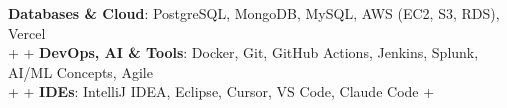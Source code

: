 \documentclass[letterpaper,10pt]{article}                                                                                                                                                                                                                                                                                                                                                                                                                                                                                                                                                                         +
\begin{document}
\begin{itemize}[leftmargin=0.15in, label={}, itemsep=2pt]
{{  \textbf{Databases \& Cloud}{: PostgreSQL, MongoDB, MySQL, AWS (EC2, S3, RDS), Vercel} \\                                                                                                                                                                                                                                                                                                                                                                                                                                                                                                                         +
                                                                                                                                                                                                                                                                                                                                                                                                                                                                                                                                                                                                                   +
  \textbf{DevOps, AI \& Tools}{: Docker, Git, GitHub Actions, Jenkins, Splunk, AI/ML Concepts, Agile} \\                                                                                                                                                                                                                                                                                                                                                                                                                                                                                                           +
                                                                                                                                                                                                                                                                                                                                                                                                                                                                                                                                                                                                                   +
  \textbf{IDEs}{: IntelliJ IDEA, Eclipse, Cursor, VS Code, Claude Code}                                                                                                                                                                                                                                                                                                                                                                                                                                                                                                                                            +
}}
\end{itemize}
\end{document}
